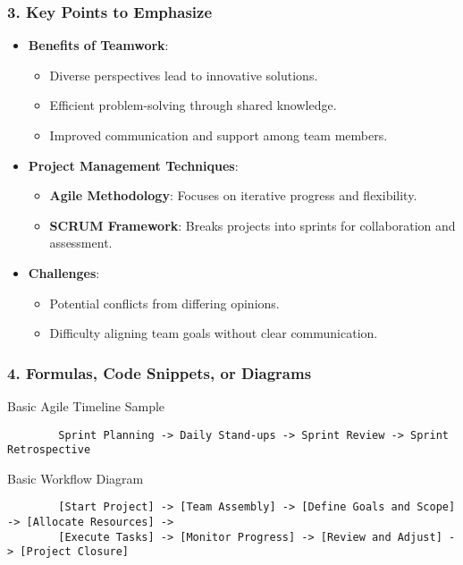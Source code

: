 \documentclass[aspectratio=169]{beamer}
\begin{document}
\begin{frame}[fragile]
    \frametitle{3. Key Points to Emphasize}
    \begin{itemize}
        \item \textbf{Benefits of Teamwork}:
        \begin{itemize}
            \item Diverse perspectives lead to innovative solutions.
            \item Efficient problem-solving through shared knowledge.
            \item Improved communication and support among team members.
        \end{itemize}
        
        \item \textbf{Project Management Techniques}:
        \begin{itemize}
            \item \textbf{Agile Methodology}: Focuses on iterative progress and flexibility.
            \item \textbf{SCRUM Framework}: Breaks projects into sprints for collaboration and assessment.
        \end{itemize}
        
        \item \textbf{Challenges}:
        \begin{itemize}
            \item Potential conflicts from differing opinions.
            \item Difficulty aligning team goals without clear communication.
        \end{itemize}
    \end{itemize}
\end{frame}

\begin{frame}[fragile]
    \frametitle{4. Formulas, Code Snippets, or Diagrams}
    \begin{block}{Basic Agile Timeline Sample}
        \begin{lstlisting}
        Sprint Planning -> Daily Stand-ups -> Sprint Review -> Sprint Retrospective
        \end{lstlisting}
    \end{block}

    \begin{block}{Basic Workflow Diagram}
        \begin{lstlisting}
        [Start Project] -> [Team Assembly] -> [Define Goals and Scope] -> [Allocate Resources] -> 
        [Execute Tasks] -> [Monitor Progress] -> [Review and Adjust] -> [Project Closure]
        \end{lstlisting}
    \end{block}
\end{frame}
\end{document}
